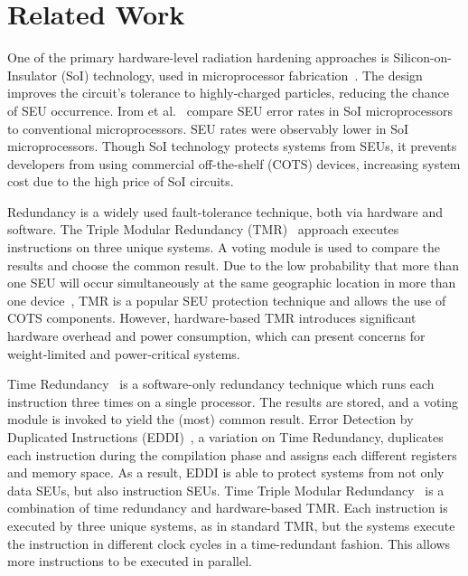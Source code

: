 \vspace{-15pt}
\section{Related Work}\label{sec:related_work}
\vspace{-10pt}
One of the primary hardware-level radiation hardening approaches is Silicon-on-Insulator (SoI) technology, used in microprocessor fabrication~\cite{Celler2003SOI}. The design improves the circuit's tolerance to highly-charged particles, reducing the chance of SEU occurrence. Irom et al.~\cite{Irom2002SOI} compare SEU error rates in  SoI microprocessors to conventional microprocessors. SEU rates were observably lower in SoI microprocessors. Though SoI technology protects systems from SEUs, it prevents developers from using commercial off-the-shelf (COTS) devices, increasing system cost due to the high price of SoI circuits.

Redundancy is a widely used fault-tolerance technique, both via hardware and software. The Triple Modular Redundancy (TMR)~\cite{TMR} approach executes instructions on three unique systems. A voting module is used to compare the results and choose the common result. Due to the low probability that more than one SEU will occur simultaneously at the same geographic location in more than one device~\cite{underwood1992observations}, TMR is a popular SEU protection technique and allows the use of COTS components. However, hardware-based TMR introduces significant hardware overhead and power consumption, which can present concerns for weight-limited and power-critical systems.

Time Redundancy~\cite{ulta2013} is a software-only redundancy technique which runs each instruction three times on a single processor. The results are stored, and a voting module is invoked to yield the (most) common result. Error Detection by Duplicated Instructions (EDDI)~\cite{oh2002error}, a variation on Time Redundancy, duplicates each instruction during the compilation phase and assigns each different registers and memory space. As a result, EDDI is able to protect systems from not only data SEUs, but also instruction SEUs. Time Triple Modular Redundancy~\cite{ulta2013} is a combination of time redundancy and hardware-based TMR. Each instruction is executed by three unique systems, as in standard TMR, but the systems execute the instruction in different clock cycles in a time-redundant fashion. This allows more instructions to be executed in parallel.


